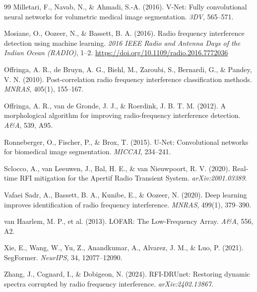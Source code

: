 \documentclass[11pt]{article}
\begin{document}
\begin{thebibliography}{99}
 Milletari, F., Navab, N., \& Ahmadi, S.-A. (2016). V-Net: Fully convolutional neural networks for volumetric medical image segmentation. \emph{3DV}, 565--571.

 Mosiane, O., Oozeer, N., \& Bassett, B. A. (2016). Radio frequency interference detection using machine learning. \emph{2016 IEEE Radio and Antenna Days of the Indian Ocean (RADIO)}, 1--2. \url{https://doi.org/10.1109/radio.2016.7772036}

 Offringa, A. R., de Bruyn, A. G., Biehl, M., Zaroubi, S., Bernardi, G., \& Pandey, V. N. (2010). Post-correlation radio frequency interference classification methods. \emph{MNRAS}, 405(1), 155--167.

 Offringa, A. R., van de Gronde, J. J., \& Roerdink, J. B. T. M. (2012). A morphological algorithm for improving radio-frequency interference detection. \emph{A\&A}, 539, A95.

 Ronneberger, O., Fischer, P., \& Brox, T. (2015). U-Net: Convolutional networks for biomedical image segmentation. \emph{MICCAI}, 234--241.

 Sclocco, A., van Leeuwen, J., Bal, H. E., \& van Nieuwpoort, R. V. (2020). Real-time RFI mitigation for the Apertif Radio Transient System. \emph{arXiv:2001.03389}.

 Vafaei Sadr, A., Bassett, B. A., Kunibe, E., \& Oozeer, N. (2020). Deep learning improves identification of radio frequency interference. \emph{MNRAS}, 499(1), 379--390.

 van Haarlem, M. P., et al. (2013). LOFAR: The Low-Frequency Array. \emph{A\&A}, 556, A2.

 Xie, E., Wang, W., Yu, Z., Anandkumar, A., Alvarez, J. M., \& Luo, P. (2021). SegFormer. \emph{NeurIPS}, 34, 12077--12090.

 Zhang, J., Cognard, I., \& Dobigeon, N. (2024). RFI-DRUnet: Restoring dynamic spectra corrupted by radio frequency interference. \emph{arXiv:2402.13867}.

\end{thebibliography}

\clearpage
\appendix
\end{document}
